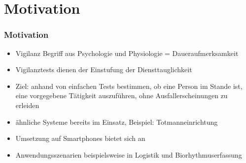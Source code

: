 \section{Motivation}
\begin{frame}
 \frametitle{Motivation}
	 \begin{itemize}[<+->]
	 \item Vigilanz Begriff aus Psychologie und Physiologie = Daueraufmerksamkeit
	 \item Vigilanztests dienen der Einstufung der Diensttauglichkeit
	 \item Ziel: anhand von einfachen Tests bestimmen, ob eine Person im Stande ist, eine vorgegebene Tätigkeit auszuführen, ohne Ausfallerscheinungen zu erleiden
	 \item ähnliche Systeme bereits im Einsatz, Beispiel: Totmanneinrichtung
	 \item Umsetzung auf Smartphones bietet sich an
	 \item Anwendungsszenarien beispielsweise in Logistik und Biorhythmuserfassung
	 \end{itemize}
\end{frame}